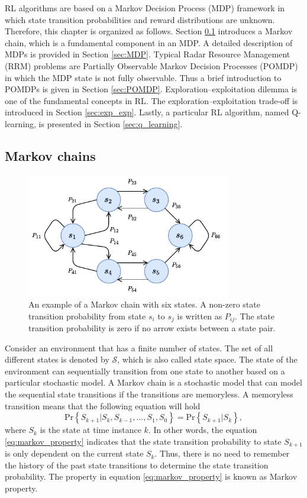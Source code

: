 \documentclass[english, 12pt, a4paper, elec, utf8, a-1b, online]{aaltothesis}
\numberwithin{equation}{section}
\newcommand{\Ss}{\mathcal{S}}
\renewcommand{\Pr}[1]{\text{Pr}\left\{ #1 \right\}}
\begin{document}
RL algorithms are based on a Markov Decision Process (MDP) framework in which state transition probabilities and reward distributions are unknown.
Therefore, this chapter is organized as follows.
Section \ref{sec:MC} introduces a Markov chain, which is a fundamental component in an MDP.
A detailed description of MDPs is provided in Section \ref{sec:MDP}.
Typical Radar Resource Management (RRM) problems are Partially Observable Markov Decision Processes (POMDP) in which the MDP state is not fully observable. 
Thus a brief introduction to POMDPs is given in Section \ref{sec:POMDP}.
Exploration--exploitation dilemma is one of the fundamental concepts in RL. 
The exploration--exploitation trade-off is introduced in Section \ref{sec:exp_exp}. 
Lastly, a particular RL algorithm, named Q-learning, is presented in Section \ref{sec:q_learning}.


\subsection{Markov chains} \label{sec:MC}

\begin{figure}[b]
    \centering
    \includegraphics[width=0.8\textwidth]{figures/MarkovChain.pdf}
    \caption{
    An example of a Markov chain with six states. 
    A non-zero state transition probability from state $s_i$ to $s_j$ is written as $P_{ij}$.
    The state transition probability is zero if no arrow exists between a state pair. }
    \label{fig:mc}
\end{figure}


Consider an environment that has a finite number of states.
The set of all different states is denoted by $\Ss$, which is also called state space.
The state of the environment can sequentially transition from one state to another based on a particular stochastic model.
A Markov chain is a stochastic model that can model the sequential state transitions if the transitions are memoryless.
A memoryless transition means that the following equation will hold   
\begin{equation} \label{eq:markov_property}
    \Pr{S_{k+1} | S_k, S_{k-1}, ..., S_1, S_0} = \Pr{S_{k+1} | S_k},
\end{equation}
where $S_k$ is the state at time instance $k$.
In other words, the equation \eqref{eq:markov_property} indicates that the state transition probability to state $S_{k+1}$ is only dependent on the current state $S_k$.
Thus, there is no need to remember the history of the past state transitions to determine the state transition probability.
The property in equation \eqref{eq:markov_property} is known as Markov property.
\end{document}
